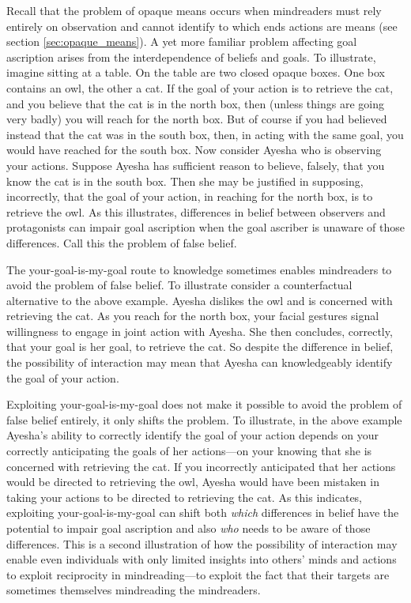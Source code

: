 \documentclass[12pt,\papersize]{extarticle}
\begin{document}
Recall that the problem of opaque means occurs when mindreaders  must rely entirely on observation and cannot identify to which ends actions are means 
(see section \vref{sec:opaque_means}).
A yet more familiar problem affecting goal ascription 
arises from the interdependence of beliefs and goals.
To illustrate, 
imagine sitting at a table.
On the table are two closed opaque boxes.
One box contains an owl, the other a cat.
If the goal of your action is to retrieve the cat, 
and you believe that the cat is in the north box,
then 
(unless things are going very badly) 
you will reach for the north box.
But of course if you had believed instead that the cat was in the south box,
then, in acting with the same goal, you would have reached for the south box.
Now consider Ayesha who is observing your actions.
Suppose Ayesha has sufficient reason to believe, falsely, that you know the cat is in the south box.
Then she may be justified in supposing, incorrectly, that 
the goal of your action, in reaching for the north box,
is to retrieve the owl.
As this illustrates,
differences in belief between observers and protagonists can 
impair goal ascription
when the goal ascriber is unaware of those differences.
Call this the problem of false belief.

The your-goal-is-my-goal
route to knowledge
sometimes enables mindreaders to avoid the problem of false belief.
To illustrate consider a counterfactual alternative to the above example.
Ayesha dislikes the owl and is concerned with retrieving the cat.
As you reach for the north box,
your facial gestures signal willingness to engage in joint action with Ayesha.
She then concludes, correctly, that your goal is her goal, to retrieve the cat.
So despite the difference in belief,
the possibility of interaction may mean that
Ayesha can knowledgeably identify the goal of your action.

Exploiting your-goal-is-my-goal does not make it possible to  avoid the problem of false belief entirely,
it only shifts  the problem.
To illustrate,
in the above example Ayesha's ability to correctly identify the goal of your action
depends on your correctly anticipating the goals of her actions---on your knowing that she is concerned with retrieving the cat.
If you incorrectly anticipated that her actions would be directed to retrieving the owl,
Ayesha would have been mistaken in taking your actions to be directed to retrieving the cat.
As this indicates,
exploiting your-goal-is-my-goal 
can shift 
both 
\emph{which} differences in belief have the potential to impair  goal ascription
and also 
\emph{who} needs to be aware of those differences.
This is a second illustration of how the possibility of interaction 
may enable 
	even individuals with only limited insights into others' minds and actions
 	to exploit reciprocity in mindreading---to exploit the fact that their targets are sometimes themselves mindreading the mindreaders.
\end{document}
